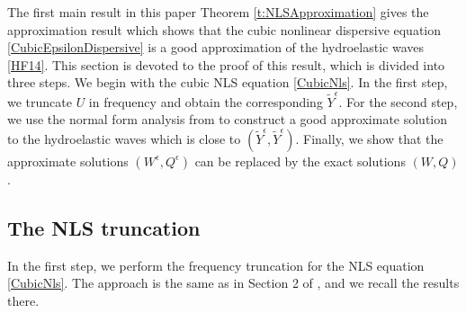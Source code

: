 \documentclass[12pt]{amsart}
\theoremstyle{remark}
\theoremstyle{definition}
\numberwithin{equation}{section}
\begin{document}
The first main result in this paper Theorem \ref{t:NLSApproximation} gives the approximation result which shows that the cubic nonlinear dispersive equation \eqref{CubicEpsilonDispersive} is a good approximation of the hydroelastic waves \eqref{HF14}.
This section is devoted to the proof of this result, which is divided into three steps.
We begin with the cubic NLS equation \eqref{CubicNls}. 
In the first step, we truncate $U$ in frequency and obtain the corresponding $\tilde{Y}^\epsilon$.
For the second step, we use the normal form analysis from \cite{MR4846707} to construct a good approximate
solution to the hydroelastic waves which is close to $(\tilde{Y}^\epsilon, \tilde{Y}^\epsilon)$.
Finally, we show that the approximate solutions $(W^\epsilon, Q^\epsilon)$ can be replaced by the exact solutions $(W, Q)$.

\subsection{The NLS truncation}
In the first step, we perform the frequency truncation for the NLS equation \eqref{CubicNls}.
The approach is the same as in Section 2 of \cite{ifrim2019nls}, and we recall the results there.
\end{document}
